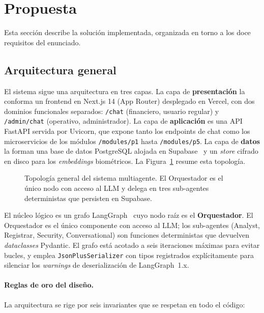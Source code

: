 \section{Propuesta}
\label{sec:propuesta}

Esta sección describe la solución implementada, organizada en torno a
los doce requisitos del enunciado.

\subsection{Arquitectura general}
\label{subsec:arquitectura}

El sistema sigue una arquitectura en tres capas. La capa de
\textbf{presentación} la conforma un frontend en Next.js 14 (App
Router) desplegado en Vercel, con dos dominios funcionales separados:
\texttt{/chat} (financiero, usuario regular) y \texttt{/admin/chat}
(operativo, administrador). La capa de \textbf{aplicación} es una
API FastAPI servida por Uvicorn, que expone tanto los endpoints de
chat como los microservicios de los módulos \texttt{/modules/p1}
hasta \texttt{/modules/p5}. La capa de \textbf{datos} la forman una
base de datos PostgreSQL alojada en Supabase~\cite{supabase} y un
\textit{store} cifrado en disco para los \textit{embeddings}
biométricos. La Figura~\ref{fig:topology} resume esta topología.

\begin{figure}[t]
    \centering
    
    \caption{Topología general del sistema multiagente. El Orquestador
    es el único nodo con acceso al LLM y delega en tres sub-agentes
    deterministas que persisten en Supabase.}
    \label{fig:topology}
\end{figure}

El núcleo lógico es un grafo LangGraph~\cite{langgraph} cuyo nodo raíz
es el \textbf{Orquestador}. El Orquestador es el único componente con
acceso al LLM; los sub-agentes (Analyst, Registrar, Security,
Conversational) son funciones deterministas que devuelven
\textit{dataclasses} Pydantic. El grafo está acotado a seis
iteraciones máximas para evitar bucles, y emplea
\texttt{JsonPlusSerializer} con tipos registrados explícitamente para
silenciar los \textit{warnings} de deserialización de LangGraph~1.x.

\paragraph{Reglas de oro del diseño.} La arquitectura se rige por
seis invariantes que se respetan en todo el código:

